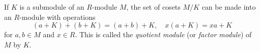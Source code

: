 If $K$ is a submodule of an $R$-module $M$, the set of cosets $M/K$ can be made into an $R$-module with operations
$$(a+K) + (b+K) = (a+b) + K, \quad x(a+K) = xa + K$$
for $a, b \in M$ and $x \in R$. This is called the \emph{quotient module} (or \emph{factor module}) of $M$ by $K$.
